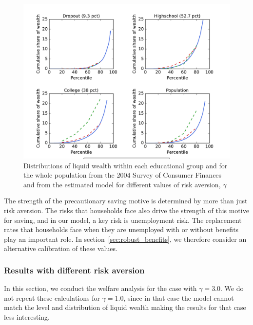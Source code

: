 \documentclass[\econtexRoot/HAFiscal]{subfiles}
\begin{document}
\begin{figure}[th]
  \begin{center}
    \includegraphics[width=.9\textwidth]{../Figures/LorenzPoints_robustness_CRRA.pdf}
    \caption{Distributions of liquid wealth within each educational group and for the whole population from the 2004 Survey of Consumer Finances and from the estimated model for different values of risk aversion, $\gamma$}
    \notinsubfile{\label{fig:LorenzPts_robustness_CRRA}}
  \end{center}
\end{figure}

The strength of the precautionary saving motive is determined by more than just risk aversion. The risks that households face also drive the strength of this motive for saving, and in our model, a key risk is unemployment risk. The replacement rates that households face when they are unemployed with or without benefits play an important role. In section~\ref{sec:robust_benefits}, we therefore consider an alternative calibration of these values. 

\subsubsection{Results with different risk aversion}
\notinsubfile{\label{sec:robust_gamma_results}}

In this section, we conduct the welfare analysis for the case with $\gamma=3.0$. We do not repeat these calculations for $\gamma=1.0$, since in that case the model cannot match the level and distribution of liquid wealth making the results for that case less interesting. 
\end{document}
